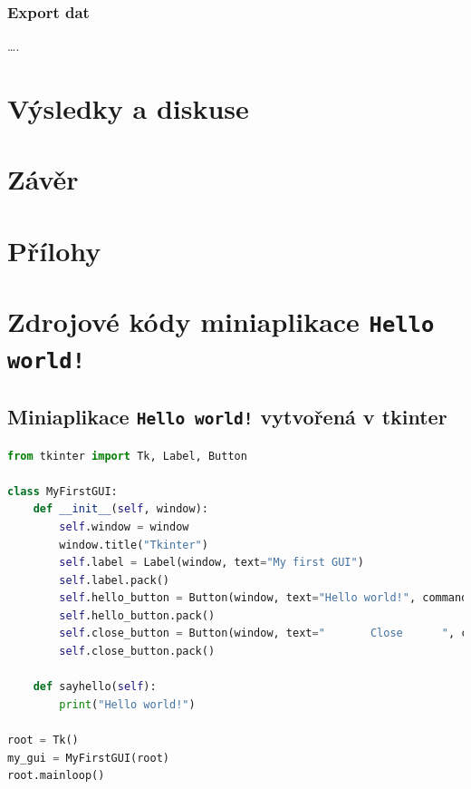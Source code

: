 \documentclass[a4paper, 12pt]{article}
\begin{document}
\subsubsection{Export dat} \label{sec:export}
\ldots .

\newpage
\section{Výsledky a diskuse} \label{sec:diskuze}

\newpage
\section{Závěr}


\newpage


\listoffigures

\newpage
\section*{Přílohy}
\appendix
\section{Zdrojové kódy miniaplikace \texttt{Hello world!}}
\label{PrilohaA}
\subsection{Miniaplikace \texttt{Hello world!} vytvořená v tkinter}
\begin{lstlisting}[language=Python]
from tkinter import Tk, Label, Button

class MyFirstGUI:
    def __init__(self, window):
        self.window = window
        window.title("Tkinter")
        self.label = Label(window, text="My first GUI")
        self.label.pack()
        self.hello_button = Button(window, text="Hello world!", command=self.sayhello)
        self.hello_button.pack()
        self.close_button = Button(window, text="       Close      ", command=window.quit)
        self.close_button.pack()

    def sayhello(self):
        print("Hello world!")

root = Tk()
my_gui = MyFirstGUI(root)
root.mainloop()
\end{lstlisting}
\end{document}

